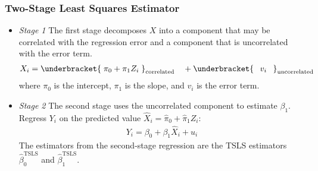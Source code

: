 

\begin{frame}
\frametitle{Two-Stage Least Squares Estimator} 
\begin{itemize}
\item \emph{Stage 1} 
\newline
The first stage decomposes $X$ into a component that may be correlated with the regression error and a component that is uncorrelated with the error term. 
\begin{align*}
X_{i} = {\underbracket{\smash{\phantom{.}\pi_{0} + \pi_{1} Z_{i}\phantom{.}}}_{\text{correlated}}}
        \quad + 
        {\underbracket{\phantom{A}v_{i}\phantom{A}}_{\text{uncorrelated}}}
\end{align*}
where $\pi_{0}$ is the intercept, $\pi_{1}$ is the slope, and $v_{i}$ is the error term. 
\item \emph{Stage 2} 
\newline
The second stage uses the uncorrelated component to estimate $\beta_{1}$.
Regress $Y_{i}$ on the predicted value $\hat{X}_{i}=\hat{\pi}_{0}+\hat{\pi}_{1}Z_{i}$:
\begin{align*}
Y_{i} = \beta_{0} + \beta_{1} \hat{X}_{i} + u_{i}
\end{align*}
The estimators from the second-stage regression are the  TSLS estimators $\hat{\beta}_{0}^{\text{TSLS}}$ and $\hat{\beta}_{1}^{\text{TSLS}}$. 
\end{itemize}
\end{frame}
